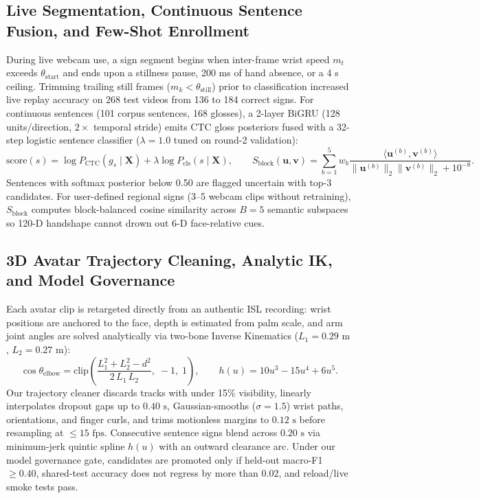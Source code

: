 \documentclass[a4paper,12pt]{article}
\begin{document}
\subsection{Live Segmentation, Continuous Sentence Fusion, and Few-Shot Enrollment}
During live webcam use, a sign segment begins when inter-frame wrist speed $m_t$ exceeds $\theta_{\text{start}}$ and ends upon a stillness pause, 200 ms of hand absence, or a 4 s ceiling. Trimming trailing still frames ($m_k < \theta_{\text{still}}$) prior to classification increased live replay accuracy on 268 test videos from 136 to 184 correct signs. For continuous sentences (101 corpus sentences, 168 glosses), a 2-layer BiGRU (128 units/direction, $2\times$ temporal stride) emits CTC gloss posteriors \cite{graves2006ctc} fused with a 32-step logistic sentence classifier ($\lambda = 1.0$ tuned on round-2 validation):
\begin{equation}
\text{score}(s) = \log P_{\text{CTC}}(g_s \mid \mathbf{X}) + \lambda \log P_{\text{cls}}(s \mid \mathbf{X}),\qquad
S_{\text{block}}(\mathbf{u},\mathbf{v}) = \sum_{b=1}^{5} w_b \frac{\langle \mathbf{u}^{(b)}, \mathbf{v}^{(b)} \rangle}{\|\mathbf{u}^{(b)}\|_2 \|\mathbf{v}^{(b)}\|_2 + 10^{-8}}.
\end{equation}
Sentences with softmax posterior below 0.50 are flagged uncertain with top-3 candidates. For user-defined regional signs (3--5 webcam clips without retraining), $S_{\text{block}}$ computes block-balanced cosine similarity across $B = 5$ semantic subspaces so 120-D handshape cannot drown out 6-D face-relative cues.

\subsection{3D Avatar Trajectory Cleaning, Analytic IK, and Model Governance}
Each avatar clip is retargeted directly from an authentic ISL recording: wrist positions are anchored to the face, depth is estimated from palm scale, and arm joint angles are solved analytically via two-bone Inverse Kinematics ($L_1 = 0.29\text{ m}$, $L_2 = 0.27\text{ m}$):
\begin{equation}
\cos\theta_{\text{elbow}} = \text{clip}\!\left(\frac{L_1^2 + L_2^2 - d^2}{2\,L_1\,L_2},\; -1,\; 1\right),\qquad h(u) = 10u^3 - 15u^4 + 6u^5.
\end{equation}
Our trajectory cleaner discards tracks with under 15\% visibility, linearly interpolates dropout gaps up to $0.40\text{ s}$, Gaussian-smooths ($\sigma = 1.5$) wrist paths, orientations, and finger curls, and trims motionless margins to $0.12\text{ s}$ before resampling at $\le 15\text{ fps}$. Consecutive sentence signs blend across $0.20\text{ s}$ via minimum-jerk quintic spline $h(u)$ with an outward clearance arc. Under our model governance gate, candidates are promoted only if held-out macro-F1 $\ge 0.40$, shared-test accuracy does not regress by more than 0.02, and reload/live smoke tests pass.
\end{document}
